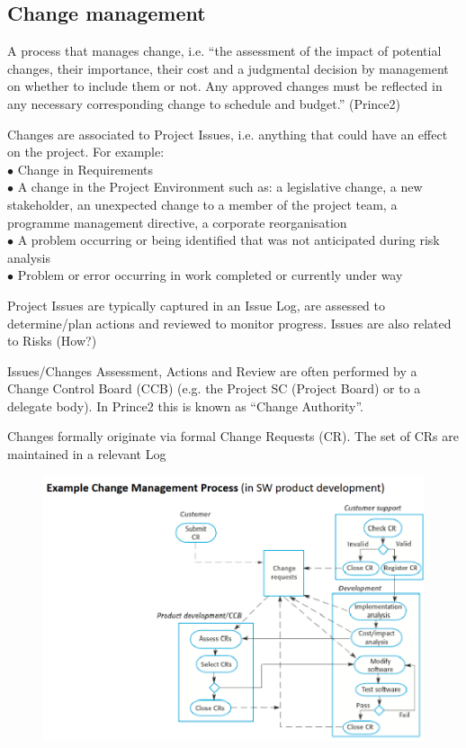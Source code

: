\documentclass[]{project_plan}
\newcommand{\bulletPoint}{\hspace{-3.1pt}$\bullet$ \hspace{5pt}}
\begin{document}
\subsection{Change management}
A process that manages change, i.e. “the assessment of the impact of potential changes,
their importance, their cost and a judgmental decision by management on whether to include them or not. Any
approved changes must be reflected in any necessary corresponding change to schedule and budget.” (Prince2)

Changes are associated to Project Issues, i.e. anything that could have an effect on the project. For example:\\
\bulletPoint Change in Requirements\\
\bulletPoint A change in the Project Environment such as: a legislative change, a new stakeholder, an unexpected change
to a member of the project team, a programme management directive, a corporate reorganisation\\
\bulletPoint A problem occurring or being identified that was not anticipated during risk analysis\\
\bulletPoint Problem or error occurring in work completed or currently under way

Project Issues are typically captured in an Issue Log, are assessed to determine/plan actions and reviewed to
monitor progress. Issues are also related to Risks (How?)

Issues/Changes Assessment, Actions and Review are often performed by a Change Control Board (CCB) (e.g.
the Project SC (Project Board) or to a delegate body). In Prince2 this is known as “Change Authority”.

Changes formally originate via formal Change Requests (CR). The set of CRs are maintained in a relevant Log

\begin{figure}[h!]
  \centering
  \includegraphics[width=\linewidth]{change_management_process.png}
\end{figure}
\end{document}

